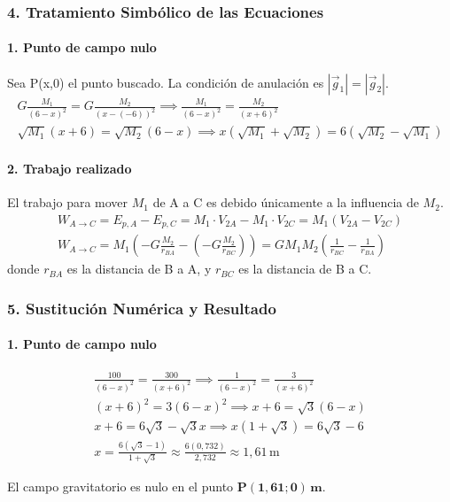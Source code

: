 \subsubsection*{4. Tratamiento Simbólico de las Ecuaciones}
\paragraph*{1. Punto de campo nulo}
Sea P(x,0) el punto buscado. La condición de anulación es $|\vec{g}_1| = |\vec{g}_2|$.
\begin{gather}
    G \frac{M_1}{(6-x)^2} = G \frac{M_2}{(x-(-6))^2} \implies \frac{M_1}{(6-x)^2} = \frac{M_2}{(x+6)^2} \\
    \sqrt{M_1}(x+6) = \sqrt{M_2}(6-x) \implies x(\sqrt{M_1}+\sqrt{M_2}) = 6(\sqrt{M_2}-\sqrt{M_1})
\end{gather}

\paragraph*{2. Trabajo realizado}
El trabajo para mover $M_1$ de A a C es debido únicamente a la influencia de $M_2$.
\begin{gather}
    W_{A \to C} = E_{p,A} - E_{p,C} = M_1 \cdot V_{2A} - M_1 \cdot V_{2C} = M_1 (V_{2A} - V_{2C}) \\
    W_{A \to C} = M_1 \left( -G\frac{M_2}{r_{BA}} - \left(-G\frac{M_2}{r_{BC}}\right) \right) = GM_1M_2 \left( \frac{1}{r_{BC}} - \frac{1}{r_{BA}} \right)
\end{gather}
donde $r_{BA}$ es la distancia de B a A, y $r_{BC}$ es la distancia de B a C.

\subsubsection*{5. Sustitución Numérica y Resultado}
\paragraph*{1. Punto de campo nulo}
\begin{gather}
    \frac{100}{(6-x)^2} = \frac{300}{(x+6)^2} \implies \frac{1}{(6-x)^2} = \frac{3}{(x+6)^2} \\
    (x+6)^2 = 3(6-x)^2 \implies x+6 = \sqrt{3}(6-x) \\
    x+6 = 6\sqrt{3} - \sqrt{3}x \implies x(1+\sqrt{3}) = 6\sqrt{3}-6 \\
    x = \frac{6(\sqrt{3}-1)}{1+\sqrt{3}} \approx \frac{6(0,732)}{2,732} \approx 1,61\,\text{m}
\end{gather}
\begin{cajaresultado}
    El campo gravitatorio es nulo en el punto $\boldsymbol{P(1,61; 0)\,\textbf{m}}$.
\end{cajaresultado}

